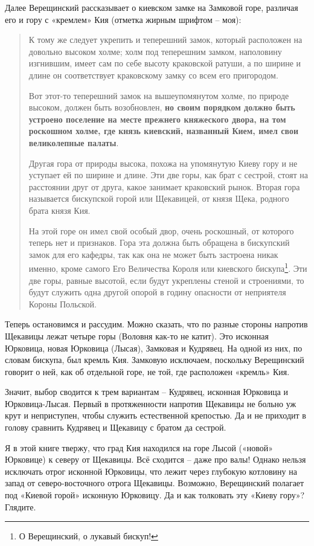 Далее Верещинский рассказывает о киевском замке на Замковой горе, различая его и гору с «кремлем» Кия (отметка жирным шрифтом – моя):

\begin{quotation}
К тому же следует укрепить и теперешний замок, который расположен на довольно высоком холме; холм под теперешним замком, наполовину изгнившим, имеет сам по себе высоту краковской ратуши, а по ширине и длине он соответствует краковскому замку со всем его  пригородом.

Вот этот-то теперешний замок на вышеупомянутом холме, по природе высоком, должен быть возобновлен, \textbf{но своим порядком должно быть устроено поселение на месте пре\-жнего княжеского двора, на том роскошном холме, где князь киевский, названный Кием, имел свои великолепные палаты}.

Другая гора от природы высока, похожа на упомянутую Киеву гору и не уступает ей по ширине и длине. Эти две горы, как брат с сестрой, стоят на расстоянии друг от друга, какое занимает краковский рынок. Вторая гора называется бискупской горой или Щекавицей, от князя Щека, родного брата князя Кия. 

На этой горе он имел свой особый двор, очень роскошный, от которого теперь нет и признаков. Гора эта должна быть обращена в бискупский замок для его кафедры, так как она не может быть застроена никак именно, кроме самого Его Величества Короля или киевского бискупа\footnote{О Верещинский, о лукавый бискуп!}. Эти две горы, равные высотой, если будут укреплены стеной и строениями, то будут служить одна другой опорой в годину опасности от неприятеля Короны Польской.
\end{quotation}

Теперь остановимся и рассудим. Можно сказать, что по разные стороны напротив Щекавицы лежат четыре горы (Воловня как-то не катит). Это исконная Юрковица, новая Юрковица (Лысая), Замковая и Кудрявец. На одной из них, по словам бискупа, был кремль Кия. Замковую исключаем, поскольку Верещинский говорит о ней, как об отдельной горе, не той, где расположен «кремль» Кия.

Значит, выбор сводится к трем вариантам – Кудрявец, исконная Юрковица и Юрковица-Лысая. Первый в протяженности напротив Щекавицы не больно уж крут и неприступен, чтобы служить естественной крепостью. Да и не приходит в голову сравнить Кудрявец и Щекавицу с братом да сестрой.

Я в этой книге твержу, что град Кия находился на горе Лысой («новой» Юрковице) к северу от Щекавицы. Всё сходится – даже про валы! Однако нельзя исключать отрог исконной Юрковицы, что лежит через глубокую котловину на запад от северо-восточного отрога Щекавицы. Возможно, Верещинский полагает под «Киевой горой» исконную Юрковицу. Да и как толковать эту «Киеву гору»? Глядите.

